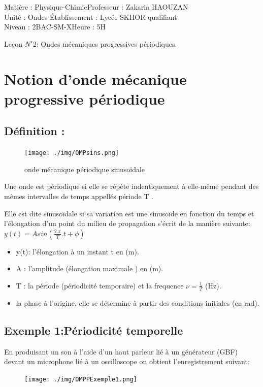 \documentclass[12pt]{article}
\author{Zakaria HAOUZAN}
\date{\today}
\newcommand\headerMe[2]{\noindent{}#1\hfill#2}
\begin{document}
\headerMe{Matière : Physique-Chimie}{Professeur : Zakaria HAOUZAN}\\
\headerMe{Unité : Ondes }{Établissement : Lycée SKHOR qualifiant}\\
\headerMe{Niveau : 2BAC-SM-X}{Heure : 5H}\\

\begin{center}

    \Large{Leçon $N^{\circ} 2 $: \color{red}Ondes mécaniques progressives périodiques. }
\end{center}


\section{Notion d’onde mécanique progressive périodique}
\subsection{Définition : }

\begin{figure}
	\vspace{-2cm}
	\texttt{[image: ./img/OMPsins.png]}
	\caption{ onde mécanique périodique sinusoïdale}
\end{figure}

Une onde est périodique si elle se répète indentiquement à elle-même pendant des mêmes intervalles de temps appellés période T .  

Elle est dite sinusoïdale si sa variation est une sinusoïde en fonction du temps et l'élongation d'un point du milieu de propagation
s'écrit de la manière suivante: \\$y(t) = Asin(\frac{2.\pi}{T}.t + \phi)$

\vspace{-0.4cm}
\begin{itemize}
\item y(t): l’élongation à un instant t en (m).
\item A : l'amplitude (élongation maximale ) en (m).
\item T : la période (périodicité temporaire) et la frequence  $\nu = \frac{1}{T}$ (Hz).
\item la phase à l'origine, elle se détermine à partir des conditions initiales (en rad).
\end{itemize}

\subsection{Exemple 1:Périodicité temporelle }
En produisant un son à l'aide d'un haut parleur lié à un générateur (GBF) devant un microphone lié à un oscilloscope on obtient
l'enregistrement suivant:
\begin{figure}[h]
	\begin{center}
		\texttt{[image: ./img/OMPPExemple1.png]}
	\end{center}
\end{figure}
\begin{center}
	\vspace{-2.5cm}
\end{center}
\end{document}
